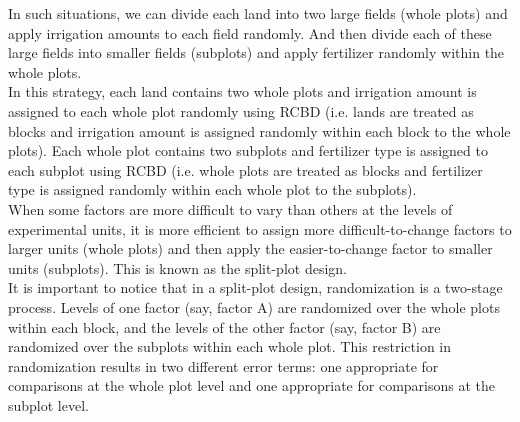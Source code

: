 In such situations, we can divide each land into two large fields (whole plots) and apply irrigation amounts to each field randomly. And then divide each of these large fields into smaller fields (subplots) and apply fertilizer randomly within the whole plots. \\

In this strategy, each land contains two whole plots and irrigation amount is assigned to each whole plot randomly using RCBD (i.e. lands are treated as blocks and irrigation amount is assigned randomly within each block to the whole plots). Each whole plot contains two subplots and fertilizer type is assigned to each subplot using RCBD (i.e. whole plots are treated as blocks and fertilizer type is assigned randomly within each whole plot to the subplots).\\

When some factors are more difficult to vary than others at the levels of experimental units, it is more efficient to assign more difficult-to-change factors to larger units (whole plots) and then apply the easier-to-change factor to smaller units (subplots). This is known as the split-plot design. \\

It is important to notice that in a split-plot design, randomization is a two-stage process. Levels of one factor (say, factor A) are randomized over the whole plots within each block, and the levels of the other factor (say, factor B) are randomized over the subplots within each whole plot. This restriction in randomization results in two different error terms: one appropriate for comparisons at the whole plot level and one appropriate for comparisons at the subplot level. \\

